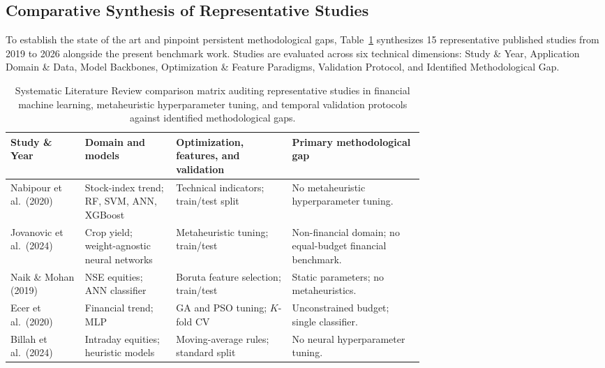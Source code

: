 \subsection{Comparative Synthesis of Representative Studies}\label{subsec:comparative_synthesis}

To establish the state of the art and pinpoint persistent methodological gaps, Table~\ref{tab:literature_gap} synthesizes 15 representative published studies from 2019 to 2026 alongside the present benchmark work. Studies are evaluated across six technical dimensions: Study \& Year, Application Domain \& Data, Model Backbones, Optimization \& Feature Paradigms, Validation Protocol, and Identified Methodological Gap.

\begin{table}[!htbp]
\caption{Systematic Literature Review comparison matrix auditing representative studies in financial machine learning, metaheuristic hyperparameter tuning, and temporal validation protocols against identified methodological gaps.}
\label{tab:literature_gap}
\centering
\manuscripttablestyle
\footnotesize
\begin{tabularx}{\linewidth}{@{}>{\raggedright\arraybackslash}p{0.18\linewidth} >{\raggedright\arraybackslash}p{0.22\linewidth} >{\raggedright\arraybackslash}p{0.29\linewidth} >{\raggedright\arraybackslash}X@{}}
\toprule
Study \& Year & Domain and models & Optimization, features, and validation & Primary methodological gap \\
\midrule
Nabipour et al.\ (2020) \cite{nabipour2020predicting} & Stock-index trend; RF, SVM, ANN, XGBoost & Technical indicators; train/test split & No metaheuristic hyperparameter tuning. \\
Jovanovic et al.\ (2024) \cite{jovanovic2024wann} & Crop yield; weight-agnostic neural networks & Metaheuristic tuning; train/test & Non-financial domain; no equal-budget financial benchmark. \\
Naik \& Mohan (2019) \cite{naik2019optimal} & NSE equities; ANN classifier & Boruta feature selection; train/test & Static parameters; no metaheuristics. \\
Ecer et al.\ (2020) \cite{ecer2020mlp_ga_pso} & Financial trend; MLP & GA and PSO tuning; $K$-fold CV & Unconstrained budget; single classifier. \\
Billah et al.\ (2024) \cite{billah2024nca_moving_average} & Intraday equities; heuristic models & Moving-average rules; standard split & No neural hyperparameter tuning. \\

\end{tabularx}
\end{table}

